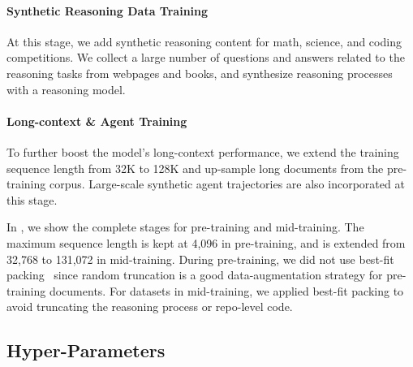 \paragraph{Synthetic Reasoning Data Training} At this stage, we add synthetic reasoning content for math, science, and coding competitions. We collect a large number of questions and answers related to the reasoning tasks from webpages and books, and synthesize reasoning processes with a reasoning model.
\paragraph{Long-context \& Agent Training} To further boost the model's long-context performance, we extend the training sequence length from 32K to 128K and up-sample long documents from the pre-training corpus. Large-scale synthetic agent trajectories are also incorporated at this stage.

In , we show the complete stages for pre-training and mid-training. The maximum sequence length is kept at 4,096 in pre-training, and is extended from 32,768 to 131,072 in mid-training. During pre-training, we did not use best-fit packing~\cite{ding2024fewer} since random truncation is a good data-augmentation strategy for pre-training documents. For datasets in mid-training, we applied best-fit packing to avoid truncating the reasoning process or repo-level code.

\subsection{Hyper-Parameters}

